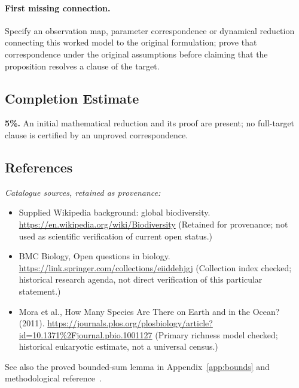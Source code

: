 \documentclass[11pt]{article}
\begin{document}
\paragraph{First missing connection.} Specify an observation map, parameter correspondence or dynamical reduction connecting this worked model to the original formulation; prove that correspondence under the original assumptions before claiming that the proposition resolves a clause of the target.
\subsection{Completion Estimate}
\textbf{5\%.} An initial mathematical reduction and its proof are present; no full-target clause is certified by an unproved correspondence.
\subsection{References}
\noindent\emph{Catalogue sources, retained as provenance:}
\begin{itemize}
\item Supplied Wikipedia background: global biodiversity. \url{https://en.wikipedia.org/wiki/Biodiversity} (Retained for provenance; not used as scientific verification of current open status.)
\item BMC Biology, Open questions in biology. \url{https://link.springer.com/collections/eiiddehjgj} (Collection index checked; historical research agenda, not direct verification of this particular statement.)
\item Mora et al., How Many Species Are There on Earth and in the Ocean? (2011). \url{https://journals.plos.org/plosbiology/article?id=10.1371%2Fjournal.pbio.1001127} (Primary richness model checked; historical eukaryotic estimate, not a universal census.)
\end{itemize}
\noindent See also the proved bounded-sum lemma in Appendix~\ref{app:bounds} and methodological reference~\cite{hoeffding}.
\end{document}
